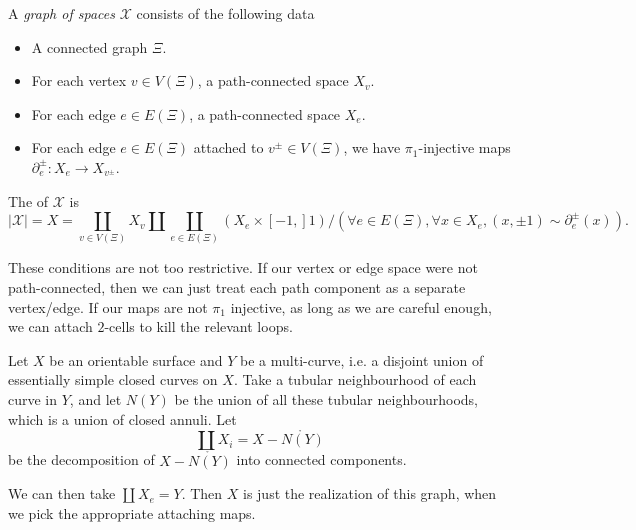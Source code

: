 \documentclass[a4paper]{article}
\begin{document}
\begin{defi}
  A \emph{graph of spaces} $\mathcal{X}$ consists of the following data
  \begin{itemize}
    \item A connected graph $\Xi$.
    \item For each vertex $v \in V(\Xi)$, a path-connected space $X_v$.
    \item For each edge $e \in E(\Xi)$, a path-connected space $X_e$.
    \item For each edge $e \in E(\Xi)$ attached to $v^{\pm} \in V(\Xi)$, we have $\pi_1$-injective maps $\partial^{\pm}_e : X_e \to X_{v^{\pm}}$.
  \end{itemize}
  The  of $\mathcal{X}$ is
  \[
    |\mathcal{X}| = X = \coprod_{v \in V(\Xi)} X_v \amalg \coprod_{e \in E(\Xi)} (X_e \times [-1, ]1)/(\forall e \in E(\Xi), \forall x \in X_e, (x, \pm 1) \sim \partial_e^{\pm}(x)).
  \]
\end{defi}
These conditions are not too restrictive. If our vertex or edge space were not path-connected, then we can just treat each path component as a separate vertex/edge. If our maps are not $\pi_1$ injective, as long as we are careful enough, we can attach $2$-cells to kill the relevant loops.


\begin{eg}
  Let $X$ be an orientable surface and $Y$ be a multi-curve, i.e. a disjoint union of essentially simple closed curves on $X$. Take a tubular neighbourhood of each curve in $Y$, and let $N(Y)$ be the union of all these tubular neighbourhoods, which is a union of closed annuli. Let
  \[
    \coprod X_i = X - \mathring{N(Y)}
  \]
  be the decomposition of $X - \mathring{N(Y)}$ into connected components.


  We can then take $\coprod X_e = Y$. Then $X$ is just the realization of this graph, when we pick the appropriate attaching maps.
\end{eg}
\end{document}
